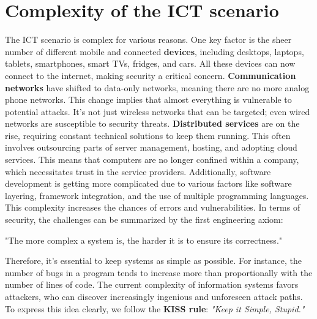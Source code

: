 \section{Complexity of the ICT scenario}
The ICT scenario is complex for various reasons. One key factor is the sheer number of different mobile and connected \textbf{devices}, including desktops, laptops, tablets, smartphones, smart TVs, fridges, and cars. All these devices can now connect to the internet, making security a critical concern.
\textbf{Communication networks } have shifted to data-only networks, meaning there are no more analog phone networks. This change implies that almost everything is vulnerable to potential attacks. It's not just wireless networks that can be targeted; even wired networks are susceptible to security threats.
\textbf{Distributed services} are on the rise, requiring constant technical solutions to keep them running. This often involves outsourcing parts of server management, hosting, and adopting cloud services. This means that computers are no longer confined within a company, which necessitates trust in the service providers. Additionally, software development is getting more complicated due to various factors like software layering, framework integration, and the use of multiple programming languages. This complexity increases the chances of errors and vulnerabilities.
In terms of security, the challenges can be summarized by the first engineering axiom:
\begin{center}
  "The more complex a system is, the harder it is to ensure its correctness."
\end{center}
Therefore, it's essential to keep systems as simple as possible. For instance, the number of bugs in a program tends to increase more than proportionally with the number of lines of code. The current complexity of information systems favors attackers, who can discover increasingly ingenious and unforeseen attack paths.\\
To express this idea clearly, we follow the \textbf{KISS rule}: \emph{"Keep it Simple, Stupid."}




